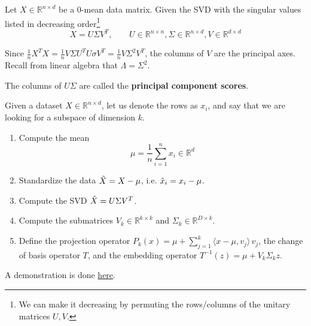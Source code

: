   \begin{theorem} 
    Let $X \in \mathbb{R}^{n \times d}$ be a $0$-mean data matrix. Given the SVD with the singular values listed in decreasing order\footnote{We can make it decreasing by permuting the rows/columns of the unitary matrices $U, V$.}
    \begin{equation}
      X = U \Sigma V^T, \qquad U \in \mathbb{R}^{n \times n}, \Sigma \in \mathbb{R}^{n \times d}, V \in \mathbb{R}^{d \times d}
    \end{equation}
  \end{theorem}

  Since $\frac{1}{n} X^T X = \frac{1}{n} V \Sigma U^T U \sigma V^T = \frac{1}{n} V \Sigma^2 V^T$, the columns of $V$ are the principal axes. Recall from linear algebra that $\Lambda = \Sigma^2$. 

  \begin{definition}
    The columns of $U \Sigma$ are called the \textbf{principal component scores}. 
  \end{definition}

  \begin{algo} 
    Given a dataset $X \in \mathbb{R}^{n \times d}$, let us denote the rows as $x_i$, and say that we are looking for a subspace of dimension $k$. 
    \begin{enumerate}
      \item Compute the mean 
      \begin{equation}
        \mu = \frac{1}{n} \sum_{i=1}^n x_i  \in \mathbb{R}^d
      \end{equation} 

      \item Standardize the data $\Tilde{X} = X - \mu$, i.e. $\Tilde{x}_i = x_i - \mu$.  

      \item Compute the SVD $\Tilde{X} = U \Sigma V^T$.

      \item Compute the submatrices $V_k \in \mathbb{R}^{k \times k}$ and $\Sigma_k \in \mathbb{R}^{D \times k}$. 

      \item Define the projection operator $P_k (x) = \mu + \sum_{j=1}^k \langle x - \mu, v_j \rangle \, v_j$, the change of basis operator $T$, and the embedding operator $T^{-1} (z) = \mu + V_k \Sigma_k z$. 
    \end{enumerate} 
    A demonstration is done \href{code/pca.html}{here}.
  \end{algo}

